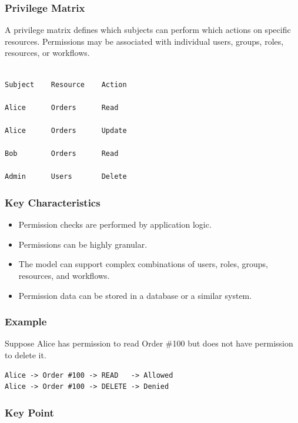 \documentclass[11pt,a4paper]{article}
\begin{document}
\subsubsection{Privilege Matrix}

A privilege matrix defines which subjects can perform which actions on specific resources. Permissions may be associated with individual users, groups, roles, resources, or workflows.

\begin{lstlisting}

Subject    Resource    Action

Alice      Orders      Read

Alice      Orders      Update

Bob        Orders      Read

Admin      Users       Delete
\end{lstlisting}

\subsubsection{Key Characteristics}

\begin{itemize}
    \item Permission checks are performed by application logic.
    \item Permissions can be highly granular.
    \item The model can support complex combinations of users, roles, groups, resources, and workflows.
    \item Permission data can be stored in a database or a similar system.
\end{itemize}

\subsubsection{Example}

Suppose Alice has permission to read Order \#100 but does not have permission to delete it.

\begin{lstlisting}
Alice -> Order #100 -> READ   -> Allowed
Alice -> Order #100 -> DELETE -> Denied
\end{lstlisting}

\subsubsection{Key Point}
\end{document}
